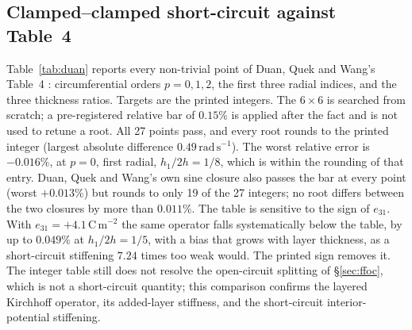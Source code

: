 \documentclass[11pt]{article}
\begin{document}
\subsection{Clamped--clamped short-circuit against Table~4}
\label{sec:table4}
Table~\ref{tab:duan} reports every non-trivial point of Duan, Quek and
Wang's Table~4 \cite{duan2005}: circumferential orders $p=0,1,2$, the
first three radial indices, and the three thickness ratios. Targets are
the printed integers. The $6\times6$ is searched from scratch; a
pre-registered relative bar of $0.15\%$ is applied after the fact and is
not used to retune a root. All 27 points pass, and every root rounds to
the printed integer (largest absolute difference
$0.49\,\mathrm{rad\,s^{-1}}$). The worst relative error is $-0.016\%$,
at $p=0$, first radial, $h_1/2h=1/8$, which is within the rounding of
that entry. Duan, Quek and Wang's own sine closure also passes the bar
at every point (worst $+0.013\%$) but rounds to only 19 of the 27
integers; no root differs between the two closures by more than
$0.011\%$. The table is sensitive to the sign of $e_{31}$. With
$e_{31}=+4.1\,\mathrm{C\,m^{-2}}$ the same operator falls
systematically below the table, by up to $0.049\%$ at $h_1/2h=1/5$,
with a bias that grows with layer thickness, as a short-circuit
stiffening $7.24$ times too weak would. The printed sign removes it.
The integer table still does not resolve the open-circuit splitting of
\S\ref{sec:ffoc}, which is not a short-circuit quantity; this comparison
confirms the layered Kirchhoff operator, its added-layer stiffness, and
the short-circuit interior-potential stiffening.
\end{document}
